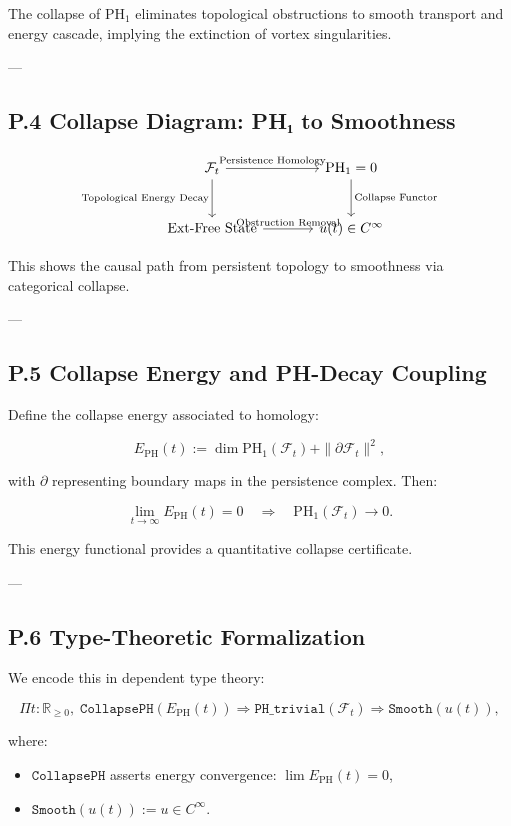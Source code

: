 \documentclass[11pt]{article}
\begin{document}
The collapse of $\mathrm{PH}_1$ eliminates topological obstructions to smooth transport and energy cascade, implying the extinction of vortex singularities.

---

\subsection*{P.4 Collapse Diagram: PH₁ to Smoothness}

\[
\begin{tikzcd}[row sep=large, column sep=large]
\mathcal{F}_t \arrow[r, "\text{Persistence Homology}"] \arrow[d, "\text{Topological Energy Decay}"']
& \mathrm{PH}_1 = 0 \arrow[d, "\text{Collapse Functor}"] \\
\text{Ext-Free State} \arrow[r, "\text{Obstruction Removal}"]
& u(t) \in C^\infty
\end{tikzcd}
\]

This shows the causal path from persistent topology to smoothness via categorical collapse.

---

\subsection*{P.5 Collapse Energy and PH-Decay Coupling}

Define the collapse energy associated to homology:

\[
E_{\mathrm{PH}}(t) := \dim \mathrm{PH}_1(\mathcal{F}_t) + \|\partial \mathcal{F}_t\|^2,
\]

with $\partial$ representing boundary maps in the persistence complex. Then:

\[
\lim_{t \to \infty} E_{\mathrm{PH}}(t) = 0 \quad \Rightarrow \quad \mathrm{PH}_1(\mathcal{F}_t) \to 0.
\]

This energy functional provides a quantitative collapse certificate.

---

\subsection*{P.6 Type-Theoretic Formalization}

We encode this in dependent type theory:

\[
\Pi t : \mathbb{R}_{\ge 0},\;
\texttt{CollapsePH}(E_{\mathrm{PH}}(t)) \Rightarrow
\texttt{PH\_trivial}(\mathcal{F}_t) \Rightarrow
\texttt{Smooth}(u(t)),
\]

where:
\begin{itemize}
  \item $\texttt{CollapsePH}$ asserts energy convergence: $\lim E_{\mathrm{PH}}(t) = 0$,
  \item $\texttt{Smooth}(u(t)) := u \in C^\infty$.
\end{itemize}
\end{document}
